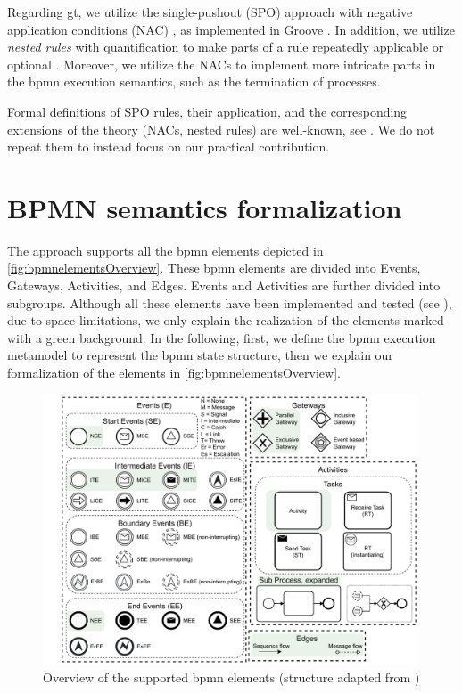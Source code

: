 \documentclass{lmcs} %
\theoremstyle{plain}\newtheorem{satz}[thm]{Satz} %
\begin{document}
Regarding \gls*{gt}, we utilize the single-pushout (SPO) approach with negative application conditions (NAC) \cite{ehrigALGEBRAICAPPROACHESGRAPH1997}, as implemented in Groove \cite{rensinkGROOVESimulatorTool2004}.
In addition, we utilize \textit{nested rules} with quantification to make parts of a rule repeatedly applicable or optional \cite{rensinkNestedQuantificationGraph2006,rensinkHowMuchAre2017}.
Moreover, we utilize the NACs to implement more intricate parts in the \gls*{bpmn} execution semantics, such as the termination of processes.

Formal definitions of SPO rules, their application, and the corresponding extensions of the theory (NACs, nested rules) are well-known, see \cite{ehrigALGEBRAICAPPROACHESGRAPH1997,rensinkNestedQuantificationGraph2006}.
We do not repeat them to instead focus on our practical contribution.


\section{BPMN semantics formalization} \label{sec:formalization}

The approach supports all the \gls*{bpmn} elements depicted in \autoref{fig:bpmnelementsOverview}.
These \gls*{bpmn} elements are divided into \textsf{Events}, \textsf{Gateways}, \textsf{Activities}, and \textsf{Edges}.
\textsf{Events} and \textsf{Activities} are further divided into subgroups.
Although all these elements have been implemented and tested (see \cite{krauterArtifactsICGT2023}), due to space limitations, we only explain the realization of the elements marked with a green background.
In the following, first, we define the \gls*{bpmn} execution metamodel to represent the \gls*{bpmn} state structure, then we explain our formalization of the elements in \autoref{fig:bpmnelementsOverview}.


\begin{figure}[ht]
    \centering
    \includegraphics[width=0.99\textwidth]{images/bpmn_semantics-elements-overview.pdf}
    \caption{Overview of the supported \gls*{bpmn} elements (structure adapted from \cite{houhouFirstOrderLogicVerification2022})}
    \label{fig:bpmnelementsOverview}
\end{figure}
\end{document}

